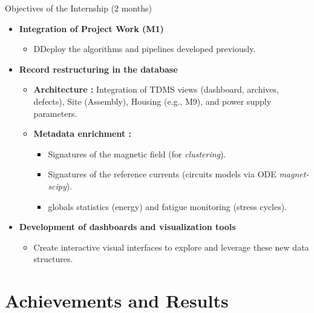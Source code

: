 \documentclass[professionalfonts,aspectratio=169]{beamer}
\begin{document}
\begin{frame}{Objectives of the Internship (2 months)}
    
    \begin{itemize}
        \item \textbf{Integration of Project Work (M1)}
        \begin{itemize}
            \item DDeploy the algorithms and pipelines developed previously.
        \end{itemize}
        
        \vspace{0.3cm}
        
        \item \textbf{Record restructuring in the database}
        \begin{itemize}
            \item \textbf{Architecture :} Integration of TDMS views (dashboard, archives, defects), Site (Assembly), Housing (e.g., M9), and power supply parameters.
            \item \textbf{Metadata enrichment :}
            \begin{itemize}
                \item Signatures of the magnetic field (for \textit{clustering}).
                \item Signatures of the reference currents (circuits models via ODE \textit{magnet-scipy}).
                \item globals statistics (energy) and fatigue monitoring (stress cycles).
            \end{itemize}
        \end{itemize}
        
        \vspace{0.3cm}
        
        \item \textbf{Development of dashboards and visualization tools}
        \begin{itemize}
            \item Create interactive visual interfaces to explore and leverage these new data structures.
        \end{itemize}
    \end{itemize}
\end{frame}


\section{Achievements and Results}
\end{document}
